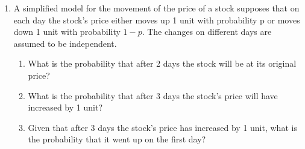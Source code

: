 \documentclass{report}
\begin{document}
\begin{enumerate}
{\bf Solution:} Let $M$ be the event that mom hid the present, $D$ be the event that dad hid the present, $U$ be the event that the present is hidden upstairs, and $N$ be the event that present is hidden downstairs. From the information given, we know $P(M)=.6$, $P(D)=.4$, $P(U\vert M)=.7$, $P(N\vert M)=.3$, $P(U\vert D) = .5$, and $P(N\vert D) =.5$. The problem is asking to find (a) $P(U)=?$ and (b) $P(D\vert N)=?$.
\begin{enumerate}
    \item 
        \begin{align*}
            P(U) &= P(U\vert M)P(M)+P(U\vert D)P(D) \\
            &= (.7)(.6)+(.5)(.4) \\
            &= .42+.2 \\
            &= .62
        \end{align*}
    \item Using the value we found for $P(U)$ in (a) and knowing that $U$ and $N$ are mutually exclusive, we know $P(N)=1-P(U)=1-.62=.38$
        \begin{align*}
            P(D\vert N) &= \frac{P(DN)}{P(N)} \\
            &=\frac{P(N\vert D) P(D)}{P(N)} \\
            &=\frac{(.5)(.4)}{.38} \\
            &= \frac{.2}{.38} \\
            &\approx .5263
        \end{align*}
\end{enumerate}

\item A simplified model for the movement of the price
of a stock supposes that on each day the stock’s
price either moves up 1 unit with probability p or
moves down 1 unit with probability $1 - p$. The
changes on different days are assumed to be independent.
\begin{enumerate}
\item What is the probability that after 2 days the
stock will be at its original price?
\item What is the probability that after 3 days the
stock’s price will have increased by 1 unit?
\item Given that after 3 days the stock’s price has
increased by 1 unit, what is the probability
that it went up on the first day?
\end{enumerate}


\end{enumerate}
\end{document}
